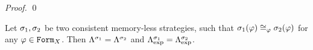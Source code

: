 \begin{proof}
  \qed
\end{proof}

\begin{corollary}
Let $\sigma_1, \sigma_2$ be two consistent memory-less strategies, such that
  $\sigma_1(\varphi) \cong_{\varphi} \sigma_2(\varphi)$ for any $\varphi\in\mathtt{Form}_X$.
Then $\Lambda^{\sigma_1} = \Lambda^{\sigma_2}$
  and $\Lambda^{\sigma_1}_\textrm{exp} = \Lambda^{\sigma_2}_\textrm{exp}$.
\end{corollary}





